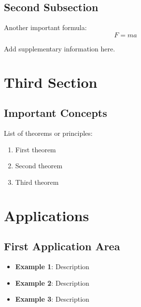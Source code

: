 \documentclass[darkmode]{a3cheatsheet}
\begin{document}
\begin{multicols}{3}


\subsection{Second Subsection}

\begin{formulabox}
Another important formula:
\begin{equation}
F = ma
\end{equation}
\end{formulabox}

\begin{infobox}
Add supplementary information here.
\end{infobox}

\section{Third Section}

\subsection{Important Concepts}

\begin{notebox}
List of theorems or principles:
\begin{enumerate}
    \item First theorem
    \item Second theorem
    \item Third theorem
\end{enumerate}
\end{notebox}


\section{Applications}

\subsection{First Application Area}

\begin{itemize}
    \item \textbf{Example 1}: Description
    \item \textbf{Example 2}: Description
    \item \textbf{Example 3}: Description
\end{itemize}


\end{multicols}
\end{document}
